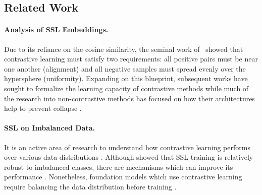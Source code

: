 
\subsection{Related Work}

\paragraph{Analysis of SSL Embeddings.} Due to its reliance on the cosine similarity, the seminal work of~\citet{understanding_contr_learn} showed that contrastive learning must satisfy two requirements: all positive pairs must be near one another (alignment) and all negative samples must spread evenly over the hypersphere (uniformity). Expanding on this blueprint, subsequent works have sought to formalize the learning capacity of contrastive methods \citep{arora_contr_theory, understanding_contr_learn, latent_inversion, provable_contr_guarantees, understanding_contr_learn_2} while much of the research into non-contrastive methods has focused on how their architectures help to prevent collapse \citep{dim_collapse_ssl, direct_pred, simsiam_avoid_collapse, BYOL_orthogonality}. %

\paragraph{SSL on Imbalanced Data.}

It is an active area of research to understand how contrastive learning performs over various data distributions \cite{latent_inversion}. Although \citet{robust_imbalance} showed that SSL training is relatively robust to imbalanced classes, there are mechanisms which can improve its performance \cite{divide_contrast, dassot}. Nonetheless, foundation models which use contrastive learning require balancing the data distribution before training \citep{demystifying_clip}.

